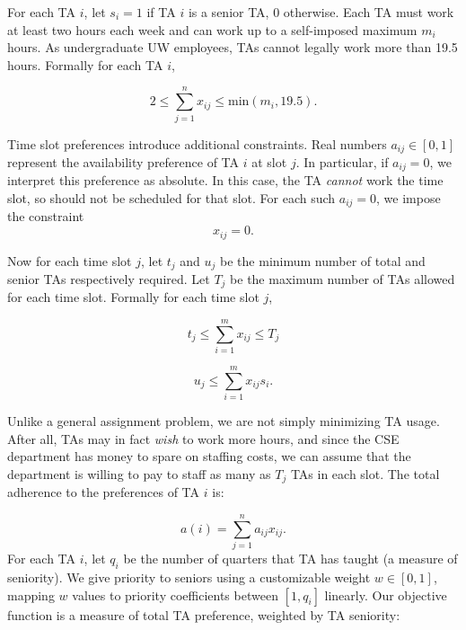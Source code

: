 \documentclass{article}
\begin{document}
\begin{multicols}{2}
For each TA $i$, let $s_i = 1$ if TA $i$ is a senior TA, 0 otherwise. Each TA must work at least two hours each week and can work up to a self-imposed maximum $m_i$ hours. As undergraduate UW employees, TAs cannot legally work more than 19.5 hours. Formally for each TA $i$,

\begin{equation}
2 \leq \sum_{j=1}^{n}x_{ij} \leq \textrm{min}(m_i, 19.5).
\end{equation}

Time slot preferences introduce additional constraints. Real numbers $a_{ij} \in [0,1]$ represent the availability preference of TA $i$ at slot $j$. In particular, if $a_{ij} = 0$, we interpret this preference as absolute. In this case, the TA \textit{cannot} work the time slot, so should not be scheduled for that slot. For each such $a_{ij} = 0$, we impose the constraint
\begin{equation}
x_{ij} = 0.
\end{equation}

Now for each time slot $j$, let $t_j$ and $u_j$ be the minimum number of total and senior TAs respectively required. Let $T_j$ be the maximum number of TAs allowed for each time slot. Formally for each time slot $j$,

\begin{equation}
t_j \leq \sum_{i=1}^{m}x_{ij} \leq T_j
\end{equation}

\begin{equation}
u_j \leq \sum_{i=1}^{m}x_{ij}s_i.
\end{equation}

Unlike a general assignment problem, we are not simply minimizing TA usage. After all, TAs may in fact \textit{wish} to work more hours, and since the CSE department has money to spare on staffing costs, we can assume that the department is willing to pay to staff as many as $T_j$ TAs in each slot. The total adherence to the preferences of TA $i$ is:

\begin{equation}
a(i) = \sum_{j=1}^na_{ij}x_{ij}.
\end{equation}
For each TA $i$, let $q_i$ be the number of quarters that TA has taught (a measure of seniority). We give priority to seniors using a customizable weight $w \in [0,1]$, mapping $w$ values to priority coefficients between $[1, q_i]$ linearly. Our objective function is a measure of total TA preference, weighted by TA seniority:


\end{multicols}
\end{document}
